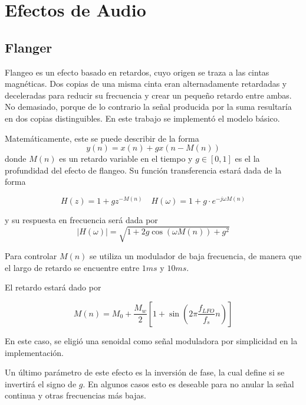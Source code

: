 \chapter{Efectos de Audio}


\section{Flanger}

Flangeo es un efecto basado en retardos, cuyo origen se traza a las cintas magnéticas. Dos copias de una misma cinta eran alternadamente retardadas y deceleradas para reducir su frecuencia y crear un pequeño retardo entre ambas. No demasiado, porque de lo contrario la señal producida por la suma resultaría en dos copias distinguibles. En este trabajo se implementó el modelo básico.

Matemáticamente, este se puede describir de la forma
\begin{equation}
    y(n)=x(n) + g x(n-M(n))
\end{equation}
donde $M(n)$ es un retardo variable en el tiempo y $g\in [0,1]$ es el la profundidad del efecto de flangeo. Su función transferencia estará dada de la forma

\begin{equation}
    H(z)=1+gz^{-M(n)}\quad H(\omega)=1+g \cdot e^{-j\omega M(n)}
\end{equation}

y su respuesta en frecuencia será dada por
\begin{equation}
    |H(\omega)|=\sqrt{1+2g\cos(\omega M(n))+g^2}
\end{equation}

Para controlar $M(n)$ se utiliza un modulador de baja frecuencia, de manera que el largo de retardo se encuentre entre $1 ms$ y $10 ms$.

El retardo estará dado por

\begin{equation*}
    M(n)=M_0 + \frac{M_w}{2} \left[1+\sin\left(2\pi \frac{f_{LFO}}{f_s} n\right)\right]
\end{equation*}

En este caso, se eligió una senoidal como señal moduladora por simplicidad en la implementación.

Un último parámetro de este efecto es la inversión de fase, la cual define si se invertirá el signo de $g$. En algunos casos esto es deseable para no anular la señal continua y otras frecuencias más bajas.

